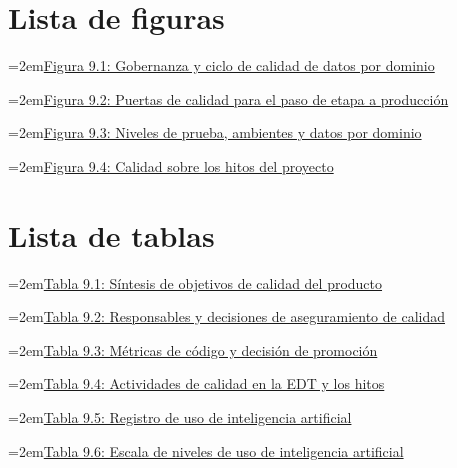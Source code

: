 \documentclass[11pt]{article}
\begin{document}
\makeatletter

\makeatother

\tableofcontents
\clearpage

\section*{Lista de figuras}

\noindent\hangindent=2em\hyperref[fig:9-1]{Figura 9.1: Gobernanza y ciclo de calidad de datos por dominio}\dotfill\pageref{fig:9-1}\par\vspace{0.4\baselineskip}
\noindent\hangindent=2em\hyperref[fig:9-2]{Figura 9.2: Puertas de calidad para el paso de etapa a producción}\dotfill\pageref{fig:9-2}\par\vspace{0.4\baselineskip}
\noindent\hangindent=2em\hyperref[fig:9-3]{Figura 9.3: Niveles de prueba, ambientes y datos por dominio}\dotfill\pageref{fig:9-3}\par\vspace{0.4\baselineskip}
\noindent\hangindent=2em\hyperref[fig:9-4]{Figura 9.4: Calidad sobre los hitos del proyecto}\dotfill\pageref{fig:9-4}\par\vspace{0.4\baselineskip}
\clearpage
\section*{Lista de tablas}

\noindent\hangindent=2em\hyperref[tab:9-1]{Tabla 9.1: Síntesis de objetivos de calidad del producto}\dotfill\pageref{tab:9-1}\par\vspace{0.4\baselineskip}
\noindent\hangindent=2em\hyperref[tab:9-2]{Tabla 9.2: Responsables y decisiones de aseguramiento de calidad}\dotfill\pageref{tab:9-2}\par\vspace{0.4\baselineskip}
\noindent\hangindent=2em\hyperref[tab:9-3]{Tabla 9.3: Métricas de código y decisión de promoción}\dotfill\pageref{tab:9-3}\par\vspace{0.4\baselineskip}
\noindent\hangindent=2em\hyperref[tab:9-4]{Tabla 9.4: Actividades de calidad en la EDT y los hitos}\dotfill\pageref{tab:9-4}\par\vspace{0.4\baselineskip}
\noindent\hangindent=2em\hyperref[tab:9-5]{Tabla 9.5: Registro de uso de inteligencia artificial}\dotfill\pageref{tab:9-5}\par\vspace{0.4\baselineskip}
\noindent\hangindent=2em\hyperref[tab:9-6]{Tabla 9.6: Escala de niveles de uso de inteligencia artificial}\dotfill\pageref{tab:9-6}\par\vspace{0.4\baselineskip}
\clearpage
\end{document}
